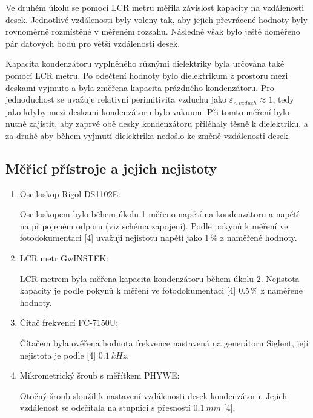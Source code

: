 \documentclass{../concepts/prepareprotokol} %
\begin{document}
Ve druhém úkolu se pomocí LCR metru měřila závislost kapacity na vzdálenosti desek. Jednotlivé vzdálenosti byly voleny tak, aby jejich převrácené hodnoty byly rovnoměrně rozmístěné v měřeném rozsahu. Následně však bylo ještě doměřeno pár datových bodů pro větší vzdálenosti desek.

Kapacita kondenzátoru vyplněného různými dielektriky byla určována také pomocí LCR metru. Po odečtení hodnoty bylo dielektrikum z prostoru mezi deskami vyjmuto a byla změřena kapacita prázdného kondenzátoru. Pro jednoduchost se uvažuje relativní perimitivita vzduchu jako $\varepsilon_{r,vzduch} \approx 1$, tedy jako kdyby mezi deskami 
kondenzátoru bylo vakuum. Při tomto měření bylo nutné zajistit, aby zaprvé obě desky kondenzátoru přiléhaly těsně k dielektriku, a za druhé aby během vyjmutí dielektrika nedošlo ke změně vzdálenosti desek.

\subsection{Měřicí přístroje a jejich nejistoty}
\begin{enumerate}
    \item Osciloskop Rigol DS1102E:
    
    Osciloskopem bylo během úkolu 1 měřeno napětí na kondenzátoru a napětí na připojeném 
    odporu (viz schéma zapojení). Podle pokynů k měření ve fotodokumentaci [4] 
    uvažuji nejistotu napětí jako 1\,\% z naměřené hodnoty.
    
    \item LCR metr GwINSTEK:

    LCR metrem byla měřena kapacita kondenzátoru během úkolu 2. Nejistota kapacity
    je podle pokynů k měření ve fotodokumentaci [4] 0.5\,\% z naměřené hodnoty.

    \item Čítač frekvencí FC-7150U:

    Čítačem byla ověřena hodnota frekvence nastavená na generátoru Siglent, její 
    nejistota je podle [4] $\SI{0.1}{kHz}$.

    \item Mikrometrický šroub s měřítkem PHYWE:

    Otočný šroub sloužil k nastavení vzdálenosti desek kondenzátoru. Jejich 
    vzdálenost se odečítala na stupnici s přesností $\SI{0.1}{mm}$ [4].
    
\end{enumerate}
\def\figurename{Graf}%
\setcounter{figure}{0}
\end{document}
